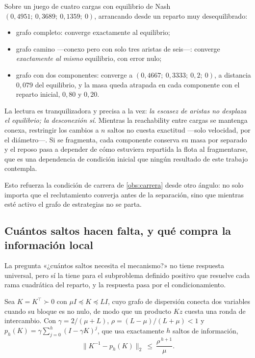 \begin{observacion}
\label{obs:grafo-estrategias}
Sobre un juego de cuatro cargas con equilibrio de Nash
$(0{,}4951;\ 0{,}3689;\ 0{,}1359;\ 0)$, arrancando desde un reparto muy
desequilibrado:
\begin{itemize}[leftmargin=1.9em,topsep=0.2em,itemsep=0.15em]
  \item grafo completo: converge exactamente al equilibrio;
  \item grafo camino —conexo pero con solo tres aristas de seis—: converge
  \emph{exactamente al mismo} equilibrio, con error nulo;
  \item grafo con dos componentes: converge a
  $(0{,}4667;\ 0{,}3333;\ 0{,}2;\ 0)$, a distancia $0{,}079$ del equilibrio, y la
  masa queda atrapada en cada componente con el reparto inicial, $0{,}80$ y
  $0{,}20$.
\end{itemize}

La lectura es tranquilizadora y precisa a la vez: \emph{la escasez de aristas no
desplaza el equilibrio; la desconexión sí}. Mientras la reachability entre cargas
se mantenga conexa, restringir los cambios a $n$ saltos no cuesta exactitud —solo
velocidad, por el diámetro—. Si se fragmenta, cada componente conserva su masa
por separado y el reposo pasa a depender de cómo estuviera repartida la flota al
fragmentarse, que es una dependencia de condición inicial que ningún resultado de
este trabajo contempla.

Esto refuerza la condición de carrera de \cref{obs:carrera} desde otro ángulo: no
solo importa que el reclutamiento converja antes de la separación, sino que
mientras esté activo el grafo de estrategias no se parta.
\end{observacion}

\subsection{Cuántos saltos hacen falta, y qué compra la información local}

La pregunta «¿cuántos saltos necesita el mecanismo?» no tiene respuesta
universal, pero sí la tiene para el subproblema definido positivo que resuelve
cada rama cuadrática del reparto, y la respuesta pasa por el condicionamiento.

\begin{teorema}
\label{th:saltos}
Sea $K=K^{\!\top}\succ0$ \cite{mayorga2026m1} con $\mu I\preceq K\preceq LI$, cuyo grafo de
dispersión conecta dos variables cuando su bloque es no nulo, de modo que un
producto $Kz$ cuesta una ronda de intercambio. Con $\gamma=2/(\mu+L)$,
$\rho=(L-\mu)/(L+\mu)<1$ y $p_h(K)=\gamma\sum_{j=0}^{h}(I-\gamma K)^{j}$, que
usa exactamente $h$ saltos de información,
\[
  \lVert K^{-1}-p_h(K)\rVert_2\ \le\ \frac{\rho^{\,h+1}}{\mu}.
\]
\end{teorema}

